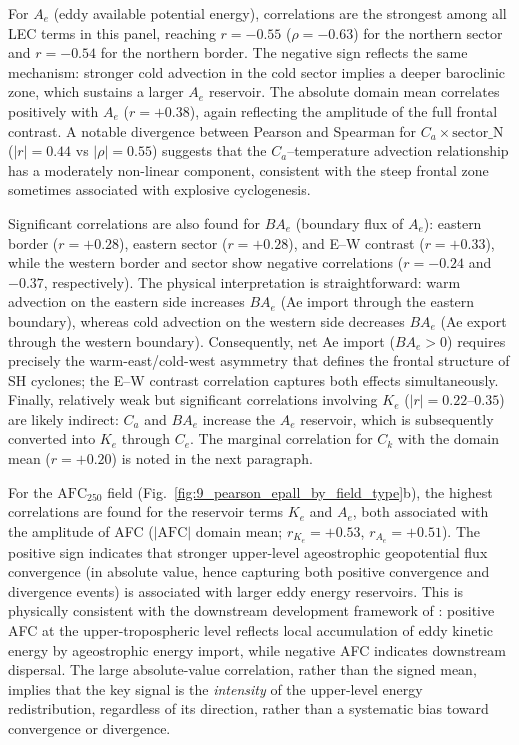 For $A_e$ (eddy available potential energy), correlations are the strongest among all
LEC terms in this panel, reaching $r = -0.55$ ($\rho = -0.63$) for the northern sector
and $r = -0.54$ for the northern border. The negative sign reflects the same mechanism:
stronger cold advection in the cold sector implies a deeper baroclinic zone, which
sustains a larger $A_e$ reservoir. The absolute domain mean correlates positively with
$A_e$ ($r = +0.38$), again reflecting the amplitude of the full frontal contrast. A
notable divergence between Pearson and Spearman for $C_a \times \mathrm{sector\_N}$
($|r| = 0.44$ vs $|\rho| = 0.55$) suggests that the $C_a$–temperature advection
relationship has a moderately non-linear component, consistent with the steep frontal
zone sometimes associated with explosive cyclogenesis.

Significant correlations are also found for $BA_e$ (boundary flux of $A_e$): eastern
border ($r = +0.28$), eastern sector ($r = +0.28$), and E–W contrast ($r = +0.33$),
while the western border and sector show negative correlations ($r = -0.24$ and
$-0.37$, respectively). The physical interpretation is straightforward: warm advection
on the eastern side increases $BA_e$ (Ae import through the eastern boundary), whereas
cold advection on the western side decreases $BA_e$ (Ae export through the western
boundary). Consequently, net Ae import ($BA_e > 0$) requires precisely the
warm-east/cold-west asymmetry that defines the frontal structure of SH cyclones; the
E–W contrast correlation captures both effects simultaneously. Finally, relatively weak
but significant correlations involving $K_e$ ($|r| = 0.22$–$0.35$) are likely
indirect: $C_a$ and $BA_e$ increase the $A_e$ reservoir, which is subsequently
converted into $K_e$ through $C_e$. The marginal correlation for $C_k$ with the domain
mean ($r = +0.20$) is noted in the next paragraph.


For the $\mathrm{AFC}_{250}$ field (Fig.~\ref{fig:9_pearson_epall_by_field_type}b),
the highest correlations are found for the reservoir terms $K_e$ and $A_e$, both
associated with the amplitude of AFC ($|\mathrm{AFC}|$ domain mean;
$r_{K_e} = +0.53$, $r_{A_e} = +0.51$). The positive sign indicates that stronger
upper-level ageostrophic geopotential flux convergence (in absolute value, hence
capturing both positive convergence and divergence events) is associated with larger
eddy energy reservoirs. This is physically consistent with the downstream development
framework of \citet{orlanski1991life,orlanski1993ageostrophic}: positive AFC at the
upper-tropospheric level reflects local accumulation of eddy kinetic energy
by ageostrophic energy import, while negative AFC indicates downstream dispersal.
The large absolute-value correlation, rather than the signed mean, implies that the key
signal is the \emph{intensity} of the upper-level energy redistribution, regardless of
its direction, rather than a systematic bias toward convergence or divergence.

